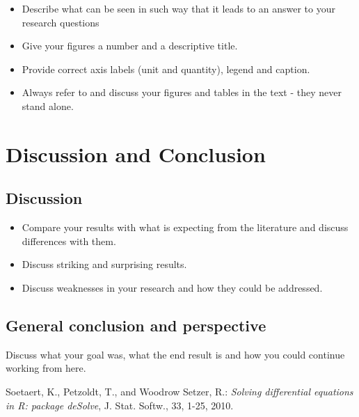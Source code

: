 \documentclass[
]{article}
\providecommand{\tightlist}{%
  \setlength{\itemsep}{0pt}\setlength{\parskip}{0pt}}
\begin{document}
\begin{itemize}
\tightlist
\item
  Describe what can be seen in such way that it leads to an answer to
  your research questions
\item
  Give your figures a number and a descriptive title.
\item
  Provide correct axis labels (unit and quantity), legend and caption.
\item
  Always refer to and discuss your figures and tables in the text - they
  never stand alone.
\end{itemize}

\hypertarget{discussion-and-conclusion}{%
\section{Discussion and Conclusion}\label{discussion-and-conclusion}}

\hypertarget{discussion}{%
\subsection{Discussion}\label{discussion}}

\begin{itemize}
\tightlist
\item
  Compare your results with what is expecting from the literature and
  discuss differences with them.
\item
  Discuss striking and surprising results.
\item
  Discuss weaknesses in your research and how they could be addressed.
\end{itemize}

\hypertarget{general-conclusion-and-perspective}{%
\subsection{General conclusion and
perspective}\label{general-conclusion-and-perspective}}

Discuss what your goal was, what the end result is and how you could
continue working from here.

\begin{thebibliography}{9}

Soetaert, K., Petzoldt, T., and Woodrow Setzer, R.: \textit{Solving differential equations in R: package deSolve}, J. Stat. Softw., 33, 1-25, 2010.

\end{thebibliography}
\end{document}
